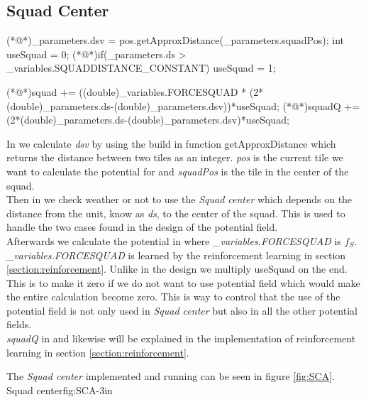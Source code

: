 	\subsection{Squad Center}	
		\begin{Sourcecode}[caption=Squad center]
(*@\lnote@*)_parameters.dsv = pos.getApproxDistance(_parameters.squadPos);	
int useSquad = 0;
(*@\lnote@*)if(_parameters.ds > _variables.SQUADDISTANCE_CONSTANT)
	useSquad = 1;

(*@\lnote@*)squad += ((double)_variables.FORCESQUAD * (2*(double)_parameters.ds-(double)_parameters.dsv))*useSquad;
(*@\lnote@*)squadQ += (2*(double)_parameters.ds-(double)_parameters.dsv)*useSquad;
\end{Sourcecode}
		In  we calculate \textit{dsv} by using the build in function getApproxDistance which returns the distance between two tiles as an integer. \textit{pos} is the current tile we want to calculate the potential for and \textit{squadPos} is the tile in the center of the squad. \\
		
		Then in  we check weather or not to use the \textit{Squad center} which depends on the distance from the unit, know as \textit{ds}, to the center of the squad. This is used to handle the two cases found in the design of the potential field. \\
		
		Afterwards we calculate the potential in  where \textit{\_variables.FORCESQUAD} is $f_{S}$. \textit{\_variables.FORCESQUAD} is learned by the reinforcement learning in section \ref{section:reinforcement}. 
		Unlike in the design we multiply useSquad on the end. This is to make it zero if we do not want to use potential field which would make the entire calculation become zero. This is way to control that the use of the potential field is not only used in \textit{Squad center} but also in all the other potential fields. \\
		
		\textit{squadQ} in  and likewise will be explained in the implementation of reinforcement learning in section \ref{section:reinforcement}.
		
		The \textit{Squad center} implemented and running can be seen in figure \ref{fig:SCA}.
			{Squad center}{fig:SCA}{-3in}
			
